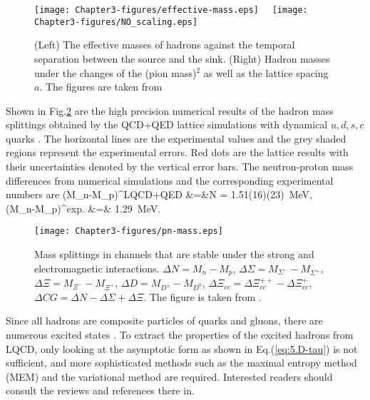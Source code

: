 \begin{figure}[t]
\begin{center}
\texttt{[image: Chapter3-figures/effective-mass.eps]} \ \ 
\texttt{[image: Chapter3-figures/NO\_scaling.eps]}
 \end{center}
\caption{(Left) The effective masses of hadrons against the 
 temporal separation between the source and the sink. 
(Right)  Hadron masses under the changes of the (pion mass)$^2$ as well as the lattice spacing $a$.
The figures are taken from \cite{Durr:2008zz}
  }
\label{fig:hadron-mass}
\end{figure}

Shown in Fig.\ref{fig:pn-mass} are the high precision numerical results of the 
 hadron mass splittings obtained by the 
 QCD+QED  lattice simulations with dynamical  $u,d,s,c$ quarks \cite{Borsanyi:2014jba}.
 The horizontal lines are the
experimental values and the grey shaded regions represent the experimental errors.
Red dots are the lattice results with their uncertainties denoted by the vertical error bars.
The neutron-proton mass differences from numerical simulations 
and the corresponding experimental numbers are
\beq
(M_n-M_p)^{\rm LQCD+QED} &=&\Delta N = 1.51(16)(23)\   {\rm MeV}, \\
(M_n-M_p)^{\rm exp.} &=& 1.29\   {\rm MeV}. 
\eeq

\begin{figure}[t]
\begin{center}
\texttt{[image: Chapter3-figures/pn-mass.eps]}
 \end{center}
\caption{Mass splittings in channels that are stable under the strong and electromagnetic interactions.
$\Delta N=M_n-M_p$, $\Delta \Sigma = M_{\Sigma^-}- M_{\Sigma^+}$,
$\Delta \Xi =M_{\Xi^-}- M_{\Xi^+}$,
$\Delta D= M_{D^{\pm}} - M_{D^0}$,
$\Delta \Xi_{cc} = \Delta \Xi_{cc}^{++} - \Delta \Xi_{cc}^{+}$,
$\Delta CG = \Delta N-\Delta \Sigma + \Delta \Xi$.
The figure is taken from
\cite{Borsanyi:2014jba}.
  }
\label{fig:pn-mass}
\end{figure}

Since all hadrons are composite particles of quarks and gluons,
there are numerous excited states  \cite{RPP}.  To extract the properties of the
excited hadrons from LQCD,  only looking at the asymptotic form as shown in Eq.(\ref{eq:5.D-tau}) is not
 sufficient, and more sophisticated methods such as  
 the maximal entropy method (MEM)  and  the variational method  are required.
 Interested readers should consult the reviews \cite{Asakawa:2000tr,Fodor:2012gf} and references there in.


